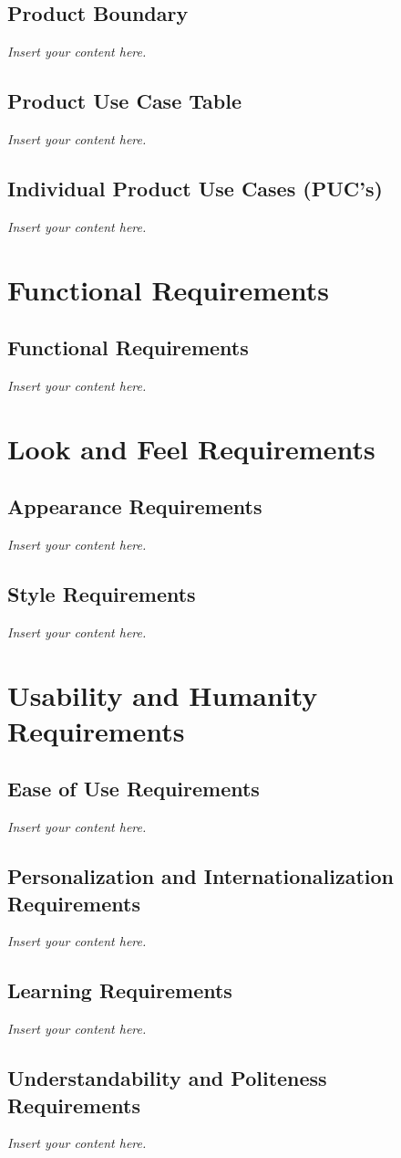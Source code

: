\documentclass[12pt]{article}
\newcommand{\lips}{\textit{Insert your content here.}}
\begin{document}
\subsection{Product Boundary}
\lips
\subsection{Product Use Case Table}
\lips
\subsection{Individual Product Use Cases (PUC's)}
\lips

\section{Functional Requirements}
\subsection{Functional Requirements}
\lips

\section{Look and Feel Requirements}
\subsection{Appearance Requirements}
\lips
\subsection{Style Requirements}
\lips

\section{Usability and Humanity Requirements}
\subsection{Ease of Use Requirements}
\lips
\subsection{Personalization and Internationalization Requirements}
\lips
\subsection{Learning Requirements}
\lips
\subsection{Understandability and Politeness Requirements}
\lips
\end{document}
